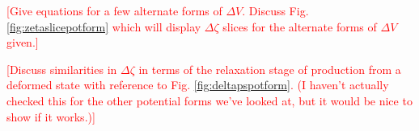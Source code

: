 \Fzetaslicepotform

\textcolor{red}{[Give equations for a few alternate forms of $\Delta V$. Discuss Fig. \ref{fig:zetaslicepotform} which will display $\Delta\zeta$ slices for the alternate forms of $\Delta V$ given.]}

\Fdeltapspotform

\textcolor{red}{[Discuss similarities in $\Delta\zeta$ in terms of the relaxation stage of production from a deformed state with reference to Fig. \ref{fig:deltapspotform}. (I haven't actually checked this for the other potential forms we've looked at, but it would be nice to show if it works.)]}
